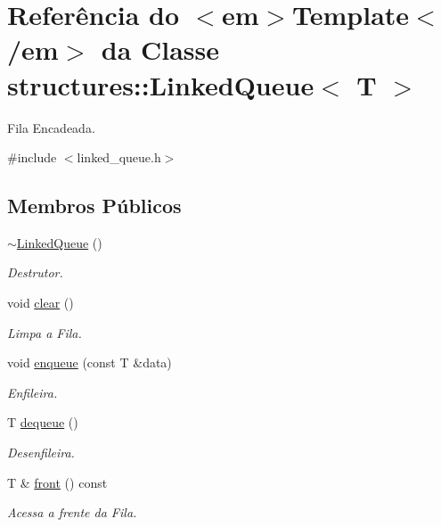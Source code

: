 \hypertarget{classstructures_1_1_linked_queue}{}\section{Referência do $<$em$>$Template$<$/em$>$ da Classe structures\+::Linked\+Queue$<$ T $>$}
\label{classstructures_1_1_linked_queue}


Fila Encadeada.  




{\ttfamily \#include $<$linked\+\_\+queue.\+h$>$}

\subsection*{Membros Públicos}
\begin{DoxyCompactItemize}
\item 
\mbox{\hyperlink{classstructures_1_1_linked_queue_ab08efd98f87a1dcd7a2c40588778cb80}{$\sim$\+Linked\+Queue}} ()
\begin{DoxyCompactList}\small\item\em Destrutor. \end{DoxyCompactList}\item 
void \mbox{\hyperlink{classstructures_1_1_linked_queue_a7fd13289965085b6224d3c87e9555a1a}{clear}} ()
\begin{DoxyCompactList}\small\item\em Limpa a Fila. \end{DoxyCompactList}\item 
void \mbox{\hyperlink{classstructures_1_1_linked_queue_a5027f4816daee604112244f85f3cac10}{enqueue}} (const T \&data)
\begin{DoxyCompactList}\small\item\em Enfileira. \end{DoxyCompactList}\item 
T \mbox{\hyperlink{classstructures_1_1_linked_queue_aa4bc66721090abcbd77549fc53694de8}{dequeue}} ()
\begin{DoxyCompactList}\small\item\em Desenfileira. \end{DoxyCompactList}\item 
T \& \mbox{\hyperlink{classstructures_1_1_linked_queue_aa6d2f0263b390193d2aae72499aa00b4}{front}} () const
\begin{DoxyCompactList}\small\item\em Acessa a frente da Fila. \end{DoxyCompactList}\item 

\end{DoxyCompactItemize}
